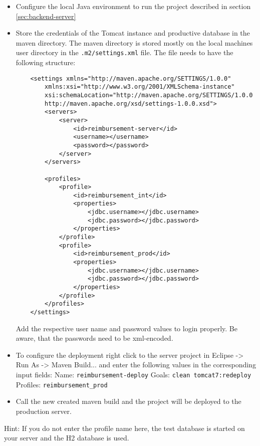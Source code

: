 \begin{itemize}
    \item Configure the local Java environment to run the project described in section \ref{sec:backend-server}
    \item Store the credentials of the Tomcat instance and productive database in the maven directory. The maven directory is stored mostly on the local machines user directory in the \texttt{.m2/settings.xml} file. The file needs to have the following structure:

    \begin{lstlisting}
    <settings xmlns="http://maven.apache.org/SETTINGS/1.0.0"
        xmlns:xsi="http://www.w3.org/2001/XMLSchema-instance"
        xsi:schemaLocation="http://maven.apache.org/SETTINGS/1.0.0
        http://maven.apache.org/xsd/settings-1.0.0.xsd">
    	<servers>
    		<server>
    			<id>reimbursement-server</id>
    			<username></username>
    			<password></password>
    		</server>
    	</servers>

    	<profiles>
    		<profile>
    			<id>reimbursement_int</id>
    			<properties>
    				<jdbc.username></jdbc.username>
    				<jdbc.password></jdbc.password>
    			</properties>
    		</profile>
    		<profile>
    			<id>reimbursement_prod</id>
    			<properties>
    				<jdbc.username></jdbc.username>
    				<jdbc.password></jdbc.password>
    			</properties>
    		</profile>
    	</profiles>
    </settings>
    \end{lstlisting}

    Add the respective user name and password values to login properly. Be aware, that the passwords need to be xml-encoded.

    \item To configure the deployment right click to the server project in Eclipse -> Run As -> Maven Build... and enter the following values in the corresponding input fields:
    \newline
    Name: \texttt{reimbursement-deploy}
    \newline
    Goals: \texttt{clean tomcat7:redeploy}
    \newline
    Profiles: \texttt{reimbursement\_prod}
    \item Call the new created maven build and the project will be deployed to the production server.

\end{itemize}

Hint: If you do not enter the profile name here, the test database is started on your server and the H2 database is used.

